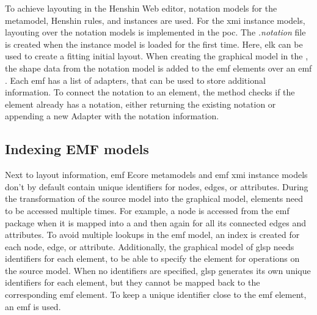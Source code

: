   To achieve layouting in the Henshin Web editor, notation models for the metamodel, Henshin rules, and instances are used. For the \ac{xmi} instance models, layouting over the notation models is implemented in the \acs{poc}. The \textit{.notation} file is created when the instance model is loaded for the first time. Here, \ac{elk} can be used to create a fitting initial layout. When creating the graphical model in the , the shape data from the notation model is added to the \ac{emf} elements over an \ac{emf} . Each \ac{emf}  has a list of adapters, that can be used to store additional information. \cite{emf} To connect the notation to an element, the  method checks if the element already has a notation, either returning the existing notation or appending a new Adapter with the notation information.

  \subsection{Indexing EMF models}
  \label{subsec:indexing}

  Next to layout information, \ac{emf} Ecore metamodels and \ac{emf} \ac{xmi} instance models don't by default contain unique identifiers for nodes, edges, or attributes. \cite{emf,emf-repo} 
  During the transformation of the source model into the graphical model, elements need to be accessed multiple times. For example, a node is accessed from the \ac{emf} package when it is mapped into a  and then again for all its connected edges and attributes. To avoid multiple lookups in the \ac{emf} model, an index is created for each node, edge, or attribute. Additionally, the graphical model of \ac{glsp} needs identifiers for each element, to be able to specify the element for operations on the source model. When no identifiers are specified, \ac{glsp} generates its own unique identifiers for each element, but they cannot be mapped back to the corresponding \ac{emf} element. To keep a unique identifier close to the \ac{emf} element, an \ac{emf}  is used. 

